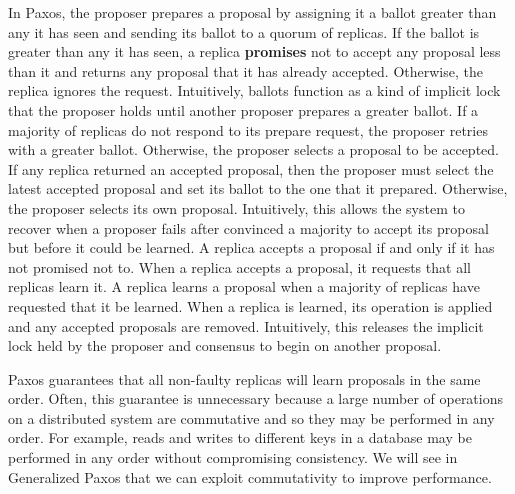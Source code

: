 \documentclass[../main.tex]{subfiles}
\begin{document}
  In Paxos, the proposer prepares a proposal by assigning it a ballot greater than any it has seen
  and sending its ballot to a quorum of replicas. If the ballot is greater than any it has seen, a
  replica \textbf{promises} not to accept any proposal less than it and returns any proposal that it
  has already accepted. Otherwise, the replica ignores the request. Intuitively, ballots function as
  a kind of implicit lock that the proposer holds until another proposer prepares a greater ballot.
  If a majority of replicas do not respond to its prepare request, the proposer retries with a
  greater ballot. Otherwise, the proposer selects a proposal to be accepted. If any replica
  returned an accepted proposal, then the proposer must select the latest accepted proposal and set
  its ballot to the one that it prepared. Otherwise, the proposer selects its own proposal.
  Intuitively, this allows the system to recover when a proposer fails after convinced a
  majority to accept its proposal but before it could be learned. A replica accepts a proposal if
  and only if it has not promised not to. When a replica accepts a proposal, it requests that all
  replicas learn it. A replica learns a proposal when a majority of replicas have requested that it
  be learned. When a replica is learned, its operation is applied and any accepted proposals are
  removed. Intuitively, this releases the implicit lock held by the proposer and consensus to begin
  on another proposal.

  Paxos guarantees that all non-faulty replicas will learn proposals in the same order. Often, this
  guarantee is unnecessary because a large number of operations on a distributed system are
  commutative and so they may be performed in any order. For example, reads and writes to different
  keys in a database may be performed in any order without compromising consistency. We will see in
  Generalized Paxos that we can exploit commutativity to improve performance.
\end{document}
